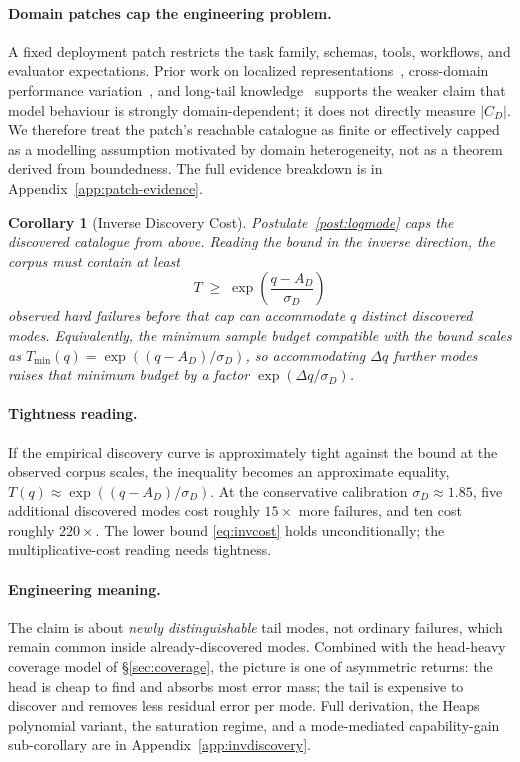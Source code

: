 \documentclass{article}
\theoremstyle{taeplain}
\newtheorem{corollary}{Corollary}
\theoremstyle{taedefn}
\newcommand{\teApprox}{\ensuremath{\approx}}
\begin{document}
\paragraph{Domain patches cap the engineering problem.}
A fixed deployment patch restricts the task family, schemas, tools, workflows, and evaluator expectations. Prior work on localized representations~\citep{park2024linear,li2025stratified}, cross-domain performance variation~\citep{wangy2024mmlupro}, and long-tail knowledge~\citep{mallen2023popqa,kandpal2023longtail} supports the weaker claim that model behaviour is strongly domain-dependent; it does not directly measure $|C_D|$. We therefore treat the patch's reachable catalogue as finite or effectively capped as a modelling assumption motivated by domain heterogeneity, not as a theorem derived from boundedness. The full evidence breakdown is in Appendix~\ref{app:patch-evidence}.

\begin{corollary}[Inverse Discovery Cost]\label{cor:invdiscovery}
Postulate~\ref{post:logmode} caps the discovered catalogue from above. Reading the bound in the inverse direction, the corpus must contain at least
\begin{equation}\label{eq:invcost}
T \;\geq\; \exp\!\left(\frac{q - A_D}{\sigma_D}\right)
\end{equation}
observed hard failures before that cap can accommodate $q$ distinct discovered modes. Equivalently, the minimum sample budget compatible with the bound scales as $T_{\min}(q) = \exp((q - A_D)/\sigma_D)$, so accommodating $\Delta q$ further modes raises that minimum budget by a factor $\exp(\Delta q / \sigma_D)$.
\end{corollary}

\paragraph{Tightness reading.}
If the empirical discovery curve is approximately tight against the bound at the observed corpus scales, the inequality becomes an approximate equality, $T(q) \teApprox \exp((q - A_D)/\sigma_D)$. At the conservative calibration $\sigma_D \teApprox 1.85$, five additional discovered modes cost roughly $15\times$ more failures, and ten cost roughly $220\times$. The lower bound \eqref{eq:invcost} holds unconditionally; the multiplicative-cost reading needs tightness.

\paragraph{Engineering meaning.}
The claim is about \emph{newly distinguishable} tail modes, not ordinary failures, which remain common inside already-discovered modes. Combined with the head-heavy coverage model of \S\ref{sec:coverage}, the picture is one of asymmetric returns: the head is cheap to find and absorbs most error mass; the tail is expensive to discover and removes less residual error per mode. Full derivation, the Heaps polynomial variant, the saturation regime, and a mode-mediated capability-gain sub-corollary are in Appendix~\ref{app:invdiscovery}.
\end{document}
